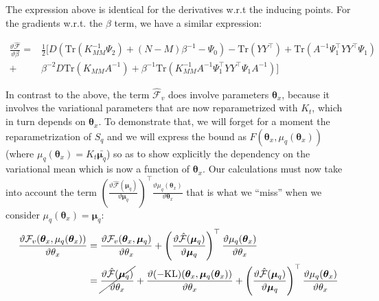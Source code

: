 The expression above is identical for the derivatives w.r.t the
inducing points.  For the gradients w.r.t. the $\beta$ term, we have a
similar expression:



\begin{align}
\frac{\vartheta \hat{\mathcal{F}}}{\vartheta \beta} ={}&
  \frac{1}{2} \Big[ 
      D \left( \text{Tr}(K_{MM}^{-1} \Psi_2) + (N-M)\beta^{-1} - \Psi_0 \right) - \text{Tr}(Y Y^\top)
	  + \text{Tr}(A^{-1}\Psi_1^\top Y Y^\top \Psi_1) \nonumber \\
   +{}& \beta^{-2} D \text{Tr} ( K_{MM} A^{-1} ) + \beta^{-1} \text{Tr} \left( K_{MM}^{-1} A^{-1} \Psi_1^\top Y Y^\top \Psi_1 A^{-1} \right) \Big]
\label{derivb2}
\end{align}


In contrast to the above, the term $\hat{\mathcal{F}}_v$ does involve
parameters $\boldsymbol \theta_x$, because it involves the variational
parameters that are now reparametrized with $K_t$, which in turn
depends on $\boldsymbol \theta_x$.  To demonstrate that, we will
forget for a moment the reparametrization of $S_q$ and we will express
the bound as $F(\boldsymbol \theta_x, \mu_q (\boldsymbol \theta_x))$
(where $\mu_q (\boldsymbol \theta_x) = K_t \bar{\boldsymbol \mu_q}$)
so as to show explicitly the dependency on the variational mean which
is now a function of $\boldsymbol \theta_x$. Our calculations must now
take into account the term $ \left( \frac{\vartheta
    \hat{\mathcal{F}}(\boldsymbol \mu_q)}{\vartheta \boldsymbol \mu_q}
\right)^\top \frac{\vartheta \mu_q (\boldsymbol \theta_x)}{\vartheta
  \boldsymbol \theta_x} $ that is what we ``miss'' when we consider
$\mu_q(\boldsymbol \theta_x) = \boldsymbol \mu_q$:
\begin{align}
\frac{\vartheta \mathcal{F}_v(\boldsymbol \theta_x, \mu_q(\boldsymbol \theta_x))}{\vartheta \theta_x} = {}&
	\frac{\vartheta \mathcal{F}_v(\boldsymbol \theta_x, \boldsymbol \mu_q)}{\vartheta \theta_x} 
  +  \left( \frac{\vartheta \hat{\mathcal{F}}(\boldsymbol \mu_q)}{\vartheta \boldsymbol \mu_q} \right)^\top
            \frac{\vartheta \mu_q(\boldsymbol \theta_x)}{\vartheta \theta_x} \nonumber \\
= {}&
 \cancel{
    \frac{\vartheta \hat{\mathcal{F}}(\boldsymbol \mu_q)}{\vartheta \theta_x}
  } +
  \frac{\vartheta (-\text{KL})(\boldsymbol \theta_x, \boldsymbol \mu_q(\boldsymbol \theta_x))}{\vartheta \theta_x}
+  \left( \frac{\vartheta \hat{\mathcal{F}}(\boldsymbol \mu_q)}{\vartheta \boldsymbol \mu_q} \right)^\top
            \frac{\vartheta \mu_q(\boldsymbol \theta_x)}{\vartheta \theta_x}
\label{meanReparamDerivFTheta}
\end{align}

